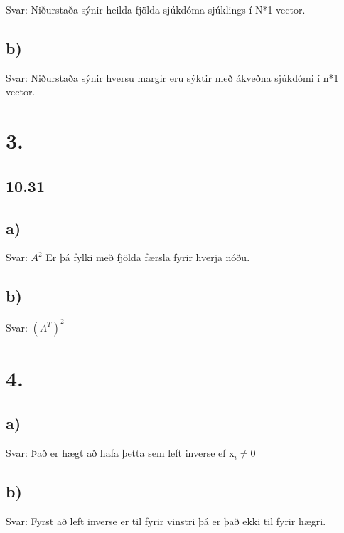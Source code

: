 \documentclass[]{article}
\begin{document}
	Svar: Niðurstaða sýnir heilda fjölda sjúkdóma sjúklings í N*1 vector.
	
	\subsection*{b)}
	
	Svar: Niðurstaða sýnir hversu margir eru sýktir með ákveðna sjúkdómi í n*1 	vector.
	\pagebreak
	\section*{3.}
	
	\subsection*{10.31}
	
		
	\subsection*{a)}
	
	Svar: $ A^{2} $ Er þá fylki með fjölda færsla fyrir hverja nóðu.
	
	\subsection*{b)}
	
	Svar: $(A^{T})^{2}$
	
	\section*{4.}
	
	\subsection*{a)}
	
	Svar: Það er hægt að hafa þetta sem left inverse ef x$ _{i} \neq 0$
	
	\subsection*{b)}
	
	Svar: Fyrst að left inverse er til fyrir vinstri þá er það ekki til fyrir hægri. 
	
\end{document}
